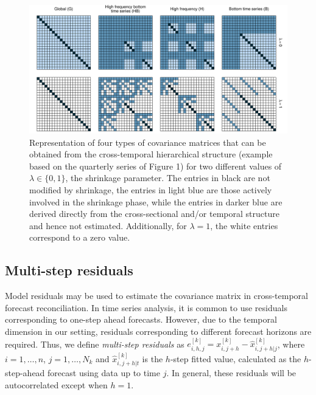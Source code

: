 \documentclass[a4paper,11pt]{article}
\theoremstyle{definition}
\begin{document}
\begin{figure}[!t]
	\centering
	\includegraphics[width = \linewidth]{fig/shr_color2.pdf}
	\caption{Representation of four types of covariance matrices that can be obtained from the cross-temporal hierarchical structure (example based on the quarterly series of Figure 1) for two different values of $\lambda \in \{0, 1\}$, the shrinkage parameter. The entries in black are not modified by shrinkage, the entries in light blue are those actively involved in the shrinkage phase, while the entries in darker blue are derived directly from the cross-sectional and/or temporal structure and hence not estimated. Additionally, for $\lambda = 1$, the white entries correspond to a zero value.}
	\label{fig:shr_vis}
\end{figure}

\subsection{Multi-step residuals} \label{ssec:multi_res}

Model residuals may be used to estimate the covariance matrix in cross-temporal forecast reconciliation. In time series analysis, it is common to use residuals corresponding to one-step ahead forecasts. However, due to the temporal dimension in our setting, residuals corresponding to different forecast horizons are required. Thus, we define \textit{multi-step residuals} as $e_{i,h,j}^{[k]} = x_{i,j+h}^{[k]} - \widehat{x}_{i,j+h|j}^{[k]}$, where $i = 1,\dots,n$, $j = 1,\dots,N_k$ and $\widehat{x}_{i,j+h|t}^{[k]}$ is the $h$-step fitted value, calculated as the $h$-step-ahead forecast using data up to time $j$. In general, these residuals will be autocorrelated except when $h=1$.
\end{document}
